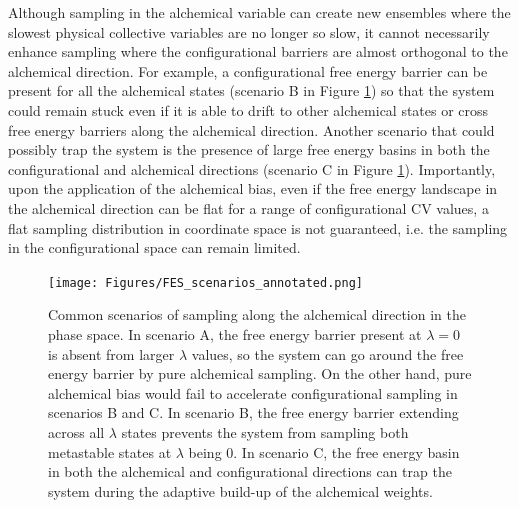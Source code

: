 \documentclass[journal=jacsat,manuscript=article]{achemso}
\begin{document}
Although sampling in the alchemical variable can create new ensembles where the slowest physical collective variables are no longer so slow, it cannot necessarily enhance sampling where the configurational barriers are almost orthogonal to the alchemical direction. For example, a configurational free energy barrier can be present for all the alchemical states (scenario B in Figure \ref{FES_scenarios}) so that the system could remain stuck even if it is able to drift to other alchemical states or cross free energy barriers along the alchemical direction. Another scenario that could possibly trap the system is the presence of large free energy basins in both the configurational and alchemical directions (scenario C in Figure \ref{FES_scenarios}). Importantly, upon the application of the alchemical bias, even if the free energy landscape in the alchemical direction can be flat for a range of configurational CV values, a flat sampling distribution in coordinate space is not guaranteed, i.e. the sampling in the configurational space can remain limited.

\begin{figure}[ht]
    \centering
    \texttt{[image: Figures/FES\_scenarios\_annotated.png]}   
    \caption{Common scenarios of sampling along the alchemical direction in the phase space. In scenario A, the free energy barrier present at $\lambda=0$ is absent from larger $\lambda$ values, so the system can go around the free energy barrier by pure alchemical sampling. On the other hand, pure alchemical bias would fail to accelerate configurational sampling in scenarios B and C. In scenario B, the free energy barrier extending across all $\lambda$ states prevents the system from sampling both metastable states at $\lambda$ being 0. In scenario C, the free energy basin in both the alchemical and configurational directions can trap the system during the adaptive build-up of the alchemical weights.}
    \label{FES_scenarios}
\end{figure}
\end{document}

